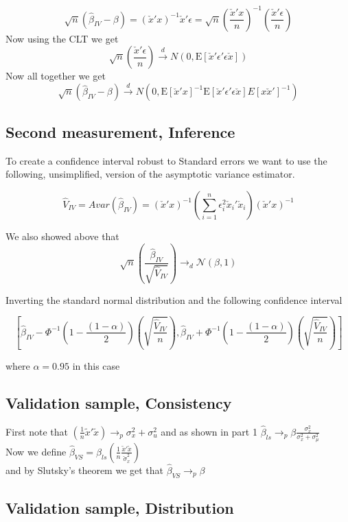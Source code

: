 \documentclass[11pt]{article}
\newcommand{\plim}{\rightarrow_{p}}
\newcommand{\E}{\mathrm{E}}
\begin{document}
$$\sqrt{n}(\hat{\beta}_{IV}-\beta) = (\check{x}'x)^{-1}\check{x}'\epsilon = \sqrt{n}\left(\frac{\check{x}'x}{n}\right)^{-1}\left(\frac{\check{x}'\epsilon}{n}\right)$$
Now using the CLT we get 
$$\sqrt{n}\left(\frac{\check{x}'\epsilon}{n}\right) \xrightarrow{d} N(0,\E[\check{x}'\epsilon'\epsilon\check{x}])$$
Now all together we get 
$$\sqrt{n}(\hat{\beta}_{IV}-\beta) \xrightarrow{d} N(0,\E[\check{x}'x]^{-1}\E[\check{x}'\epsilon'\epsilon\check{x}]E[x\check{x}']^{-1})$$

\subsection{Second measurement, Inference}
To create a confidence interval robust to Standard errors we want to use the following, unsimplified, version of the asymptotic variance estimator. 

$$\hat{V}_{IV} = Avar(\hat{\beta}_{IV}) = (\check{x}'x)^{-1}\left( \sum_{i=1}^{n}\epsilon_{i}^2 \check{x}_i' \check{x}_i \right) (\check{x}'x)^{-1}$$

We also showed above that 
$$
\sqrt{n}(\frac{\hat{\beta}_{IV}}{\sqrt{\hat{V}_{IV} }}) \to_d \mathcal{N}(\beta,1)
$$


Inverting the standard normal distribution and the following confidence interval 

$$ \left[ \hat{\beta}_{IV} - \Phi^{-1} \left( 1 -\frac{(1-\alpha)}{2} \right) \left( \sqrt{\frac{\hat{V}_{IV} }{n}} \right),  \hat{\beta}_{IV} + \Phi^{-1} \left( 1 -\frac{(1-\alpha)}{2} \right) \left( \sqrt{\frac{\hat{V}_{IV} }{n}} \right) \right] $$

where $\alpha = 0.95$ in this case 

\subsection{Validation sample, Consistency}

First note that $(\frac{1}{n}\tilde{x}'\tilde{x}) \plim \sigma_x^2 + \sigma_u^2$ and as shown in part 1 $\hat{\beta}_{ls} \plim \beta \frac{\sigma_{x}^2}{\sigma_{x}^2 + \sigma_{\mu}^2}$\\

Now we define $\hat{\beta}_{VS} = \hat{\beta}_{ls}\left(\frac{1}{n}\frac{\tilde{x}'\tilde{x}}{\check{\sigma}_x^2} \right)$ \\

and by Slutsky's theorem we get that $\hat{\beta}_{VS} \plim \beta$

\subsection{Validation sample, Distribution}
\end{document}
